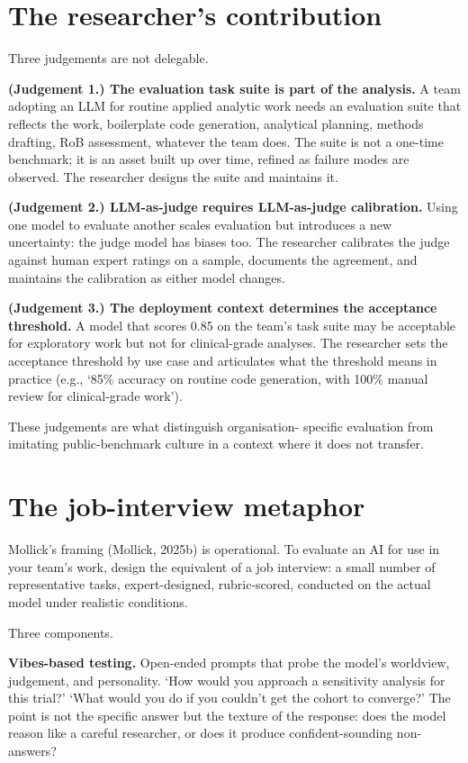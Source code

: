 \documentclass[
  letterpaper,
  11pt]{scrbook}
\begin{document}
\section{The researcher's contribution}\label{sec-evaluation-human}

Three judgements are not delegable.

\textbf{(Judgement 1.) The evaluation task suite is part of the
analysis.} A team adopting an LLM for routine applied analytic work
needs an evaluation suite that reflects the work, boilerplate code
generation, analytical planning, methods drafting, RoB assessment,
whatever the team does. The suite is not a one-time benchmark; it is an
asset built up over time, refined as failure modes are observed. The
researcher designs the suite and maintains it.

\textbf{(Judgement 2.) LLM-as-judge requires LLM-as-judge calibration.}
Using one model to evaluate another scales evaluation but introduces a
new uncertainty: the judge model has biases too. The researcher
calibrates the judge against human expert ratings on a sample, documents
the agreement, and maintains the calibration as either model changes.

\textbf{(Judgement 3.) The deployment context determines the acceptance
threshold.} A model that scores 0.85 on the team's task suite may be
acceptable for exploratory work but not for clinical-grade analyses. The
researcher sets the acceptance threshold by use case and articulates
what the threshold means in practice (e.g., `85\% accuracy on routine
code generation, with 100\% manual review for clinical-grade work').

These judgements are what distinguish organisation- specific evaluation
from imitating public-benchmark culture in a context where it does not
transfer.

\section{The job-interview metaphor}\label{the-job-interview-metaphor}

Mollick's framing (Mollick, 2025b) is operational. To evaluate an AI for
use in your team's work, design the equivalent of a job interview: a
small number of representative tasks, expert-designed, rubric-scored,
conducted on the actual model under realistic conditions.

Three components.

\textbf{Vibes-based testing.} Open-ended prompts that probe the model's
worldview, judgement, and personality. `How would you approach a
sensitivity analysis for this trial?' `What would you do if you couldn't
get the cohort to converge?' The point is not the specific answer but
the texture of the response: does the model reason like a careful
researcher, or does it produce confident-sounding non-answers?
\end{document}
